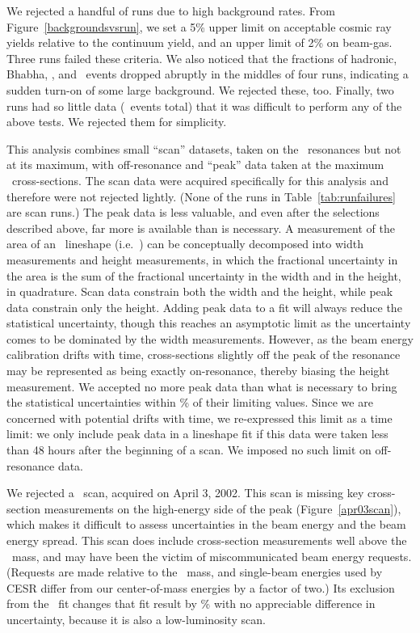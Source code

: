 \documentclass{cornell}
\begin{document}
We rejected a handful of runs due to high background rates.  From
Figure~\ref{backgroundsvsrun}, we set a 5\% upper limit on acceptable
cosmic ray yields relative to the continuum yield, and an upper limit
of 2\% on beam-gas.  Three runs failed these criteria.  We also
noticed that the fractions of hadronic, Bhabha, \gamgam, and \mumu\
events dropped abruptly in the middles of four runs, indicating a
sudden turn-on of some large background.  We rejected these, too.
Finally, two runs had so little data (\bork\ events total) that it was
difficult to perform any of the above tests.  We rejected them for
simplicity.

This analysis combines small ``scan'' datasets, taken on the \ups\
resonances but not at its maximum, with off-resonance and ``peak''
data taken at the maximum \ups\ cross-sections.  The scan data were
acquired specifically for this analysis and therefore were not
rejected lightly.  (None of the runs in Table~\ref{tab:runfailures}
are scan runs.)  The peak data is less valuable, and even after the
selections described above, far more is available than is necessary.
A measurement of the area of an \ups\ lineshape (i.e.\ \gee) can be
conceptually decomposed into width measurements and height
measurements, in which the fractional uncertainty in the area is the
sum of the fractional uncertainty in the width and in the height, in
quadrature.  Scan data constrain both the width and the height, while
peak data constrain only the height.  Adding peak data to a fit will
always reduce the statistical uncertainty, though this reaches an
asymptotic limit as the uncertainty comes to be dominated by the width
measurements.  However, as the beam energy calibration drifts with
time, cross-sections slightly off the peak of the resonance may be
represented as being exactly on-resonance, thereby biasing the height
measurement.  We accepted no more peak data than what is necessary to
bring the statistical uncertainties within \bork\% of their limiting
values.  Since we are concerned with potential drifts with time, we
re-expressed this limit as a time limit: we only include peak data in
a lineshape fit if this data were taken less than 48 hours after the
beginning of a scan.  We imposed no such limit on off-resonance data.

We rejected a \us\ scan, acquired on April 3, 2002.  This scan is
missing key cross-section measurements on the high-energy side of the
peak (Figure~\ref{apr03scan}), which makes it difficult to assess
uncertainties in the beam energy and the beam energy spread.  This
scan does include cross-section measurements well above the \ups\
mass, and may have been the victim of miscommunicated beam energy
requests.  (Requests are made relative to the \ups\ mass, and
single-beam energies used by CESR differ from our center-of-mass
energies by a factor of two.)  Its exclusion from the \us\ fit changes
that fit result by \bork\% with no appreciable difference in
uncertainty, because it is also a low-luminosity scan.
\end{document}
